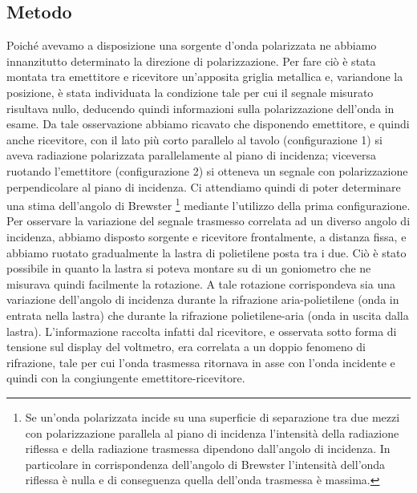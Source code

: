 \documentclass[a4paper]{article}
\begin{document}
\subsection{Metodo}
Poiché avevamo a disposizione una sorgente d'onda polarizzata ne abbiamo innanzitutto determinato la direzione di polarizzazione. Per fare ciò è stata montata tra emettitore e ricevitore un'apposita griglia metallica e, variandone la posizione, è stata individuata la condizione tale per cui il segnale misurato risultava nullo, deducendo quindi informazioni sulla polarizzazione dell'onda in esame. Da tale osservazione abbiamo ricavato che disponendo emettitore, e quindi anche ricevitore, con il lato più corto parallelo al tavolo (configurazione 1) si aveva radiazione polarizzata parallelamente al piano di incidenza; viceversa ruotando l'emettitore (configurazione 2) si otteneva un segnale con polarizzazione perpendicolare al piano di incidenza. Ci attendiamo quindi di poter determinare una stima dell'angolo di Brewster \footnote{Se un'onda polarizzata incide su una superficie di separazione tra due mezzi con polarizzazione parallela al piano di incidenza l'intensità della radiazione riflessa e della radiazione trasmessa dipendono dall'angolo di incidenza. In particolare in corrispondenza dell'angolo di Brewster l'intensità dell'onda riflessa è nulla e di conseguenza quella dell'onda trasmessa è massima.} mediante l'utilizzo della prima configurazione.
Per osservare la variazione del segnale trasmesso correlata ad un diverso angolo di incidenza, abbiamo disposto sorgente e ricevitore frontalmente, a distanza fissa, e abbiamo ruotato gradualmente la lastra di polietilene posta tra i due. Ciò è stato possibile in quanto la lastra si poteva montare su di un goniometro che ne misurava quindi facilmente la rotazione. A tale rotazione corrispondeva sia una variazione dell'angolo di incidenza durante la rifrazione aria-polietilene (onda in entrata nella lastra) che durante la rifrazione polietilene-aria (onda in uscita dalla lastra). L'informazione raccolta infatti dal ricevitore, e osservata sotto forma di tensione sul display del voltmetro, era correlata a un doppio fenomeno di rifrazione, tale per cui l'onda trasmessa ritornava in asse con l'onda incidente e quindi con la congiungente emettitore-ricevitore. 
\end{document}
